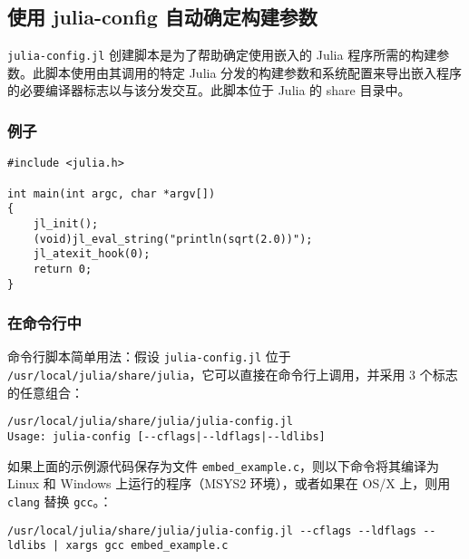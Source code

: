 \subsection{使用 julia-config 自动确定构建参数}



\texttt{julia-config.jl} 创建脚本是为了帮助确定使用嵌入的 Julia 程序所需的构建参数。此脚本使用由其调用的特定 Julia 分发的构建参数和系统配置来导出嵌入程序的必要编译器标志以与该分发交互。此脚本位于 Julia 的 share 目录中。



\hypertarget{18305016561534437319}{}


\subsubsection{例子}




\begin{lstlisting}
#include <julia.h>

int main(int argc, char *argv[])
{
    jl_init();
    (void)jl_eval_string("println(sqrt(2.0))");
    jl_atexit_hook(0);
    return 0;
}
\end{lstlisting}



\hypertarget{15399362667106734470}{}


\subsubsection{在命令行中}



命令行脚本简单用法：假设 \texttt{julia-config.jl} 位于 \texttt{/usr/local/julia/share/julia}，它可以直接在命令行上调用，并采用 3 个标志的任意组合：




\begin{lstlisting}
/usr/local/julia/share/julia/julia-config.jl
Usage: julia-config [--cflags|--ldflags|--ldlibs]
\end{lstlisting}



如果上面的示例源代码保存为文件 \texttt{embed\_example.c}，则以下命令将其编译为 Linux 和 Windows 上运行的程序（MSYS2 环境），或者如果在 OS/X 上，则用 \texttt{clang} 替换 \texttt{gcc}。：




\begin{lstlisting}
/usr/local/julia/share/julia/julia-config.jl --cflags --ldflags --ldlibs | xargs gcc embed_example.c
\end{lstlisting}



